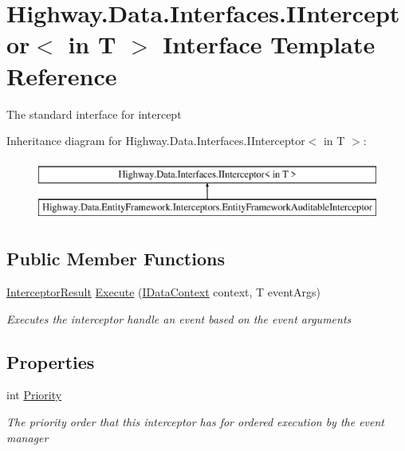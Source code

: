 \hypertarget{interface_highway_1_1_data_1_1_interfaces_1_1_i_interceptor-g}{\section{Highway.\-Data.\-Interfaces.\-I\-Interceptor$<$ in T $>$ Interface Template Reference}
\label{interface_highway_1_1_data_1_1_interfaces_1_1_i_interceptor-g}
}


The standard interface for intercept  


Inheritance diagram for Highway.\-Data.\-Interfaces.\-I\-Interceptor$<$ in T $>$\-:\begin{figure}[H]
\begin{center}
\leavevmode
\includegraphics[height=2.000000cm]{interface_highway_1_1_data_1_1_interfaces_1_1_i_interceptor-g}
\end{center}
\end{figure}
\subsection*{Public Member Functions}
\begin{DoxyCompactItemize}
\item 
\hyperlink{struct_highway_1_1_data_1_1_interceptors_1_1_interceptor_result}{Interceptor\-Result} \hyperlink{interface_highway_1_1_data_1_1_interfaces_1_1_i_interceptor-g_a9a3fc7ae745282c3a584683a2c6060e2}{Execute} (\hyperlink{interface_highway_1_1_data_1_1_interfaces_1_1_i_data_context}{I\-Data\-Context} context, T event\-Args)
\begin{DoxyCompactList}\small\item\em Executes the interceptor handle an event based on the event arguments \end{DoxyCompactList}\end{DoxyCompactItemize}
\subsection*{Properties}
\begin{DoxyCompactItemize}
\item 
int \hyperlink{interface_highway_1_1_data_1_1_interfaces_1_1_i_interceptor-g_a7d04e39fcc9ecb1139044cbdda2df23a}{Priority}
\begin{DoxyCompactList}\small\item\em The priority order that this interceptor has for ordered execution by the event manager \end{DoxyCompactList}\end{DoxyCompactItemize}


